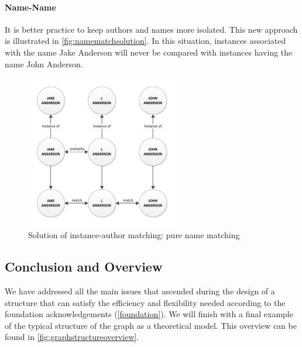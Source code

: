 \paragraph{Name-Name} It is better practice to keep authors and names more isolated. This new approach is illustrated in \autoref{fig:namematchsolution}. In this situation, instances associated with the name Jake Anderson will never be compared with instances having the name John Anderson.

\begin{figure}[htb]
	\centering
		\includegraphics[width=0.6\textwidth]{fig/namematchsolution}
	\caption{Solution of instance-author matching: pure name matching}
	\label{fig:namematchsolution}
\end{figure}

\subsection{Conclusion and Overview}
	
We have addressed all the main issues that ascended during the design of a structure that can satisfy the efficiency and flexibility needed according to the foundation acknowledgements (\autoref{foundation}). We will finish with a final example of the typical structure of the graph as a theoretical model. This overview can be found in \autoref{fig:graphstructureoverview}.

